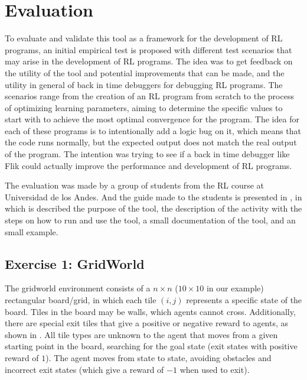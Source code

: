 
\chapter{Evaluation}
\label{cha:evaluation}

To evaluate and validate this tool as a framework for the development 
of \ac{RL} programs, an initial empirical test is proposed with different test scenarios 
that may arise in the development of \ac{RL} programs. The idea was to get feedback on 
the utility of the tool and potential improvements that can be made, 
and the utility in general of back in time debuggers for debugging \ac{RL} programs. 
The scenarios range from 
the creation of an \ac{RL} program from scratch to the process of optimizing 
learning parameters, aiming to determine the specific values to start with 
to achieve the most optimal convergence for the program. The idea for each of these 
programs is to intentionally add a logic bug on it, which means that the code runs 
normally, but the expected output does not match the real output of the program. 
The intention was trying to see if a back in time debugger like \ac{Flik} could 
actually improve the performance and development of \ac{RL} programs.

The evaluation was made by a group of students from the \ac{RL} course at Universidad de los Andes.
And the guide made to the students is presented in , in which 
is described the purpose of the tool, the description of the activity with the steps on how to run and 
use the tool, a small documentation of the tool, and an small example.

\section{Exercise 1: GridWorld}

The gridworld environment consists of a $n\times n$ ($10\times 10$ in our example) rectangular 
board/grid, in which each tile $(i,j)$ represents a specific state of the board. Tiles in the board may be 
walls, which agents cannot cross. Additionally, there are special exit 
tiles that give a positive or negative reward to agents, as shown in . All tile types 
are unknown to the agent that moves from a given starting point in the board, searching for the goal 
state (\ie exit states with positive reward of $1$). The agent moves from state to state, avoiding 
obstacles and incorrect exit states (which give a reward of $-1$ when used to exit). 

